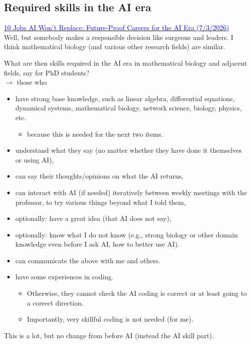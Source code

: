 \documentclass[20pt]{extarticle}
\newcommand{\hrefc}[2]{\href{#1}{\textcolor{blue}{#2}}}
\begin{document}
\subsection*{Required skills in the AI era}

\hrefc{https://prometai.app/blog/10-jobs-ai-wont-replace-future-proof-careers-for-the-ai-era}{10 Jobs AI Won't Replace: Future-Proof Careers for the AI Era (7/3/2026)}\\
Well, but somebody makes a responsible decision like surgeons and leaders. I think mathematical biology (and various other research fields) are similar.

What are then skills required in the AI era in mathematical biology and adjacent fields, say for PhD students?\\
$\to$ those who
\begin{itemize}
\item have strong base knowledge, such as linear algebra, differential equations, dynamical systems, mathematical biology, network science, biology, physics, etc.
	\begin{itemize}
	\item because this is needed for the next two items.
	\end{itemize}
\item understand what they say (no matter whether they have done it themselves or using AI),
\item can say their thoughts/opinions on what the AI returns,
\item can interact with AI (if needed) iteratively between weekly meetings with the professor, to try various things beyond what I told them,
\item optionally: have a great idea (that AI does not say),
\item optionally: know what I do not know (e.g., strong biology or other domain knowledge even before I ask AI, how to better use AI).
\item can communicate the above with me and others.
\item have some experiences in coding.
	\begin{itemize}
	\item Otherwise, they cannot check the AI coding is correct or at least going to a correct direction.
	\item Importantly, very skillful coding is not needed (for me).
	\end{itemize}
\end{itemize}
This is a lot, but no change from before AI (instead the AI skill part).
\end{document}
